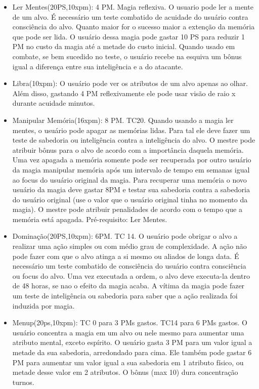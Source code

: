 \begin{itemize}
	\item Ler Mentes(20PS,10xpm): 4 PM. Magia reflexiva.\newline
O usuario pode ler a mente de um alvo. É necessário um teste combatido de acuidade do usuário contra consciência do alvo. Quanto maior for o sucesso maior a extenção da memória que pode ser lida. O usuário dessa magia pode gastar 10 PS para reduzir 1 PM no custo da magia até a metade do custo inicial. Quando usado em combate, se bem sucedido no teste, o usuário recebe na esquiva um bônus igual a diferença entre sua inteligência e a do atacante.

	\item Libra(10xpm): O usuário pode ver os atributos de um alvo apenas ao olhar. Além disso, gastando 4 PM reflexivamente ele pode usar visão de raio x durante acuidade minutos.

	\item Manipular Memória(16xpm): 8 PM. TC20.\newline
Quando usando a magia ler mentes, o usuário pode apagar as memórias lidas. Para tal ele deve fazer um teste de sabedoria ou inteligência contra a inteligência do alvo. O mestre pode atribuir bônus para o alvo de acordo com a importância daquela memória. Uma vez apagada a memória somente pode ser recuperada por outro usuário da magia manipular memória após um intervalo de tempo em semanas igual ao focus do usuário original da magia. Para recuperar uma memória o novo usuário da magia deve gastar 8PM e testar sua sabedoria contra a sabedoria do usuário original (use o valor que o usuário original tinha no momento da magia). O mestre pode atribuir penalidades de acordo com o tempo que a memória está apagada. Pré-requisito: Ler Mentes.

	\item Dominação(20PS,10xpm): 6PM. TC 14.\newline
O usuário pode obrigar o alvo a realizar uma ação simples ou com médio grau de complexidade. A ação não pode fazer com que o alvo atinga a si mesmo ou aliados de longa data. É necessário um teste combatido de consciência do usuário contra consciência ou focus do alvo. Uma vez executada a ordem, o alvo deve executa-la dentro de 48 horas, se nao o efeito da magia acaba. A vítima da magia pode fazer um teste de inteligência ou sabedoria para saber que a ação realizada foi induzida por magia.

\item Menup(20ps,10xpm): TC 0 para 3 PMs gastos. TC14 para 6 PMs gastos.\newline
O usuário concentra a magia em um alvo ou nele mesmo para aumentar uma atributo mental, exceto espírito. O usuário gasta 3 PM para um valor igual a metade da sua sabedoria, arredondado para cima. Ele também pode gastar 6 PM para aumentar um valor igual a sua sabedoria em 1 atributo físico, ou metade desse valor em 2 atributos. O bônus (max 10) dura concentração turnos.
	

\end{itemize}
